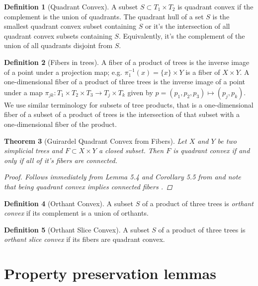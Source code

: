 \documentclass[12pt,parskip=full]{report}
\theoremstyle{plain}
\newtheorem{thm}{Theorem}[section]
\theoremstyle{definition}
\newtheorem{dfn}[thm]{Definition}
\begin{document}
\begin{dfn}
    [Quadrant Convex]
    A subset \(S \subset T_1\times T_2\) is quadrant convex if the complement is the union of quadrants. The quadrant hull of a set \(S\) is the smallest quadrant convex subset containing \(S\) or it's the intersection of all quadrant convex subsets containing \(S\). Equivalently, it's the complement of the union of all quadrants disjoint from \(S\). 
\end{dfn}

\begin{dfn}
    [Fibers in trees]
    \label{dfn:treefibers}
    A fiber of a product of trees is the inverse image of a point under a projection map; e.g. \( \pi_1^{-1}(x) = \{x\} \times Y\) is a fiber of \(X\times Y\). A one-dimensional fiber of a product of three trees is the inverse image of a point under a map \(\pi_{jk}: T_1\times T_2\times T_3 \to T_j\times T_k\) given by \(p = (p_1,p_2,p_3) \mapsto (p_j, p_k)\). We use similar terminology for subsets of tree products, that is a one-dimensional fiber of a subset of a product of trees is the intersection of that subset with a one-dimensional fiber of the product.
\end{dfn}

\begin{thm}
    [Guirardel Quadrant Convex from Fibers]
    \label{thm:guirardelsliceconvex}
    Let \(X\) and \(Y\) be two simplicial trees and \(F\subset X\times Y\) a closed subset. Then \(F\) is quadrant convex if and only if all of it's fibers are connected.
    \begin{proof}
        Follows immediately from Lemma 5.4 and Corollary 5.5 from \cite{guirardelcorepaper} and note that being quadrant convex implies connected fibers \cite{guirardelcorepaper}.
    \end{proof}
\end{thm}

\begin{dfn}
    [Orthant Convex]
    A subset \(S\) of a product of three trees is \emph{orthant convex} if its complement is a union of orthants.
\end{dfn}

\begin{dfn}
    [Orthant Slice Convex]
    A subset \(S\) of a product of three trees is \emph{orthant slice convex} if its fibers are quadrant convex.
\end{dfn}

\section{Property preservation lemmas}
\end{document}
